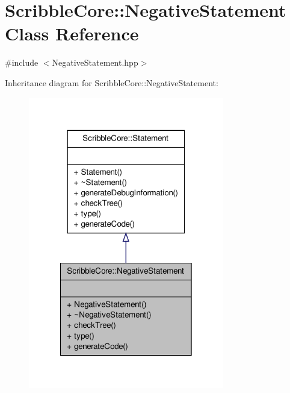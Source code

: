 \hypertarget{class_scribble_core_1_1_negative_statement}{\section{Scribble\-Core\-:\-:Negative\-Statement Class Reference}
\label{class_scribble_core_1_1_negative_statement}
}


{\ttfamily \#include $<$Negative\-Statement.\-hpp$>$}



Inheritance diagram for Scribble\-Core\-:\-:Negative\-Statement\-:
\nopagebreak
\begin{figure}[H]
\begin{center}
\leavevmode
\includegraphics[width=242pt]{class_scribble_core_1_1_negative_statement__inherit__graph}
\end{center}
\end{figure}


